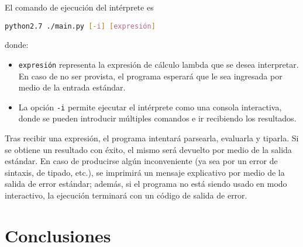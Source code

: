 \documentclass[11pt]{article}
\begin{document}
El comando de ejecución del intérprete es
\begin{center}\lstinline[language=bash]
	{python2.7 ./main.py [-i] [expresión]}
\end{center}
\noindent donde:

\begin{itemize}
\item \verb|expresión| representa la expresión de cálculo lambda que se
	desea interpretar. En caso de no ser provista, el programa esperará que le
    sea ingresada por medio de la entrada estándar.
\item La opción \verb|-i| permite ejecutar el intérprete como una consola
	interactiva, donde se pueden introducir múltiples comandos e ir recibiendo
    los resultados.
\end{itemize}

Tras recibir una expresión, el programa intentará parsearla, evaluarla y
tiparla. Si se obtiene un resultado con éxito, el mismo será devuelto por
medio de la salida estándar. En caso de producirse algún inconveniente
(ya sea por un error de sintaxis, de tipado, etc.), se imprimirá un mensaje
explicativo por medio de la salida de error estándar; además, si el programa
no está siendo usado en modo interactivo, la ejecución terminará con un código
de salida de error.


\section{Conclusiones}



\printbibliography

\end{document}
